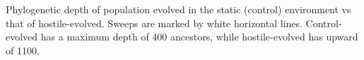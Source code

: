 Phylogenetic depth of population evolved in the static (control) environment vs that of hostile-evolved. Sweeps are marked by white horizontal lines. Control-evolved has a maximum depth of 400 ancestors, while hostile-evolved has upward of 1100.